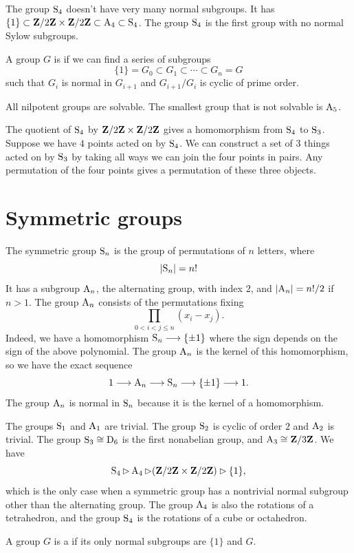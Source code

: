 \documentclass[11pt, oneside]{amsart}
\begin{document}
The group $\operatorname{S}_4$ doesn't have very many normal subgroups. It has $\{1\} \subset \mathbf Z / 2\mathbf Z \times \mathbf Z / 2\mathbf Z\subset \operatorname{A}_4 \subset \operatorname{S}_4$. The group $\operatorname{S}_4$ is the first group with no normal Sylow subgroups.
\begin{definition}
A group $G$ is  if we can find a series of subgroups
$$
\{1\} = G_0 \subset G_1 \subset \cdots \subset G_n = G
$$
such that $G_i$ is normal in $G_{i+1}$ and $G_{i+1} / G_i$ is cyclic of prime order.
\end{definition}

All nilpotent groups are solvable. The smallest group that is not solvable is $\operatorname{A}_5$. 

The quotient of $\operatorname{S}_4$ by $\mathbf Z / 2\mathbf Z\times \mathbf Z / 2\mathbf Z$ gives a homomorphism from $\operatorname{S}_4 $ to $ \operatorname{S}_3$. Suppose we have $4$ points acted on by $\operatorname{S}_4$. We can construct a set of $3$ things acted on by $\operatorname{S}_3$ by taking all ways we can join the four points in pairs. Any permutation of the four points gives a permutation of these three objects.
\section{Symmetric groups}
The symmetric group $\operatorname{S}_n$ is the group of permutations of $n$ letters, where
$$
\abs{\Sg_n} = n!%
$$ 
It has a subgroup $\operatorname{A}_n$, the alternating group, with index $2$, and $\left \lvert \operatorname{A}_n \right \rvert = n!/2$ if $n>1$. The group $\operatorname{A}_n$ consists of the permutations fixing 
$$
\prod_{0<i<j\le n} (x_i - x_j).
$$
Indeed, we have a homomorphism $\operatorname{S}_n \longrightarrow \{\pm 1\}$ where the sign depends on the sign of the above polynomial. The group $\operatorname{A}_n$ is the kernel of this homomorphism, so we have the exact sequence
$$
1 \longrightarrow \operatorname{A}_n \longrightarrow \operatorname{S}_n \longrightarrow \{\pm 1\} \longrightarrow 1.
$$
The group $\operatorname{A}_n$ is normal in $\operatorname{S}_n$ because it is the kernel of a homomorphism.

The groups $\operatorname{S}_1$ and $\operatorname{A}_1$ are trivial. The group $\operatorname{S}_2$ is cyclic of order $2$ and $\operatorname{A}_2$ is trivial. The group $\operatorname{S}_3\cong \operatorname{D}_6$ is the first nonabelian group, and $\operatorname{A}_3\cong \mathbf Z / 3\mathbf Z$. We have 
$$\operatorname{S}_4 \rhd \operatorname{A}_4 \rhd (\mathbf Z / 2\mathbf Z\times \mathbf Z / 2\mathbf Z) \rhd \{1\},$$ which is the only case when a symmetric group has a nontrivial normal subgroup other than the alternating group. The group $\operatorname{A}_4$ is also the rotations of a tetrahedron, and the group $\operatorname{S}_4$ is the rotations of a cube or octahedron. 
\begin{definition}
A group $G$ is a  if its only normal subgroups are $\{1\}$ and $G$.
\end{definition}
\end{document}
